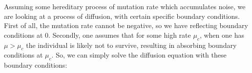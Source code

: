 Assuming some hereditary process of mutation rate which accumulates noise, we are looking at a process of diffusion,
with certain specific boundary conditions.
First of all, the mutation rate cannot be negative, so we have reflecting boundary conditions at 0.
Secondly, one assumes that for some high rate $\mu_c$, when one has \(\mu > \mu_c \) the individual is likely not to survive, resulting in absorbing boundary conditions at $\mu_c$.
So, we can simply solve the diffusion equation with these boundary conditions:
